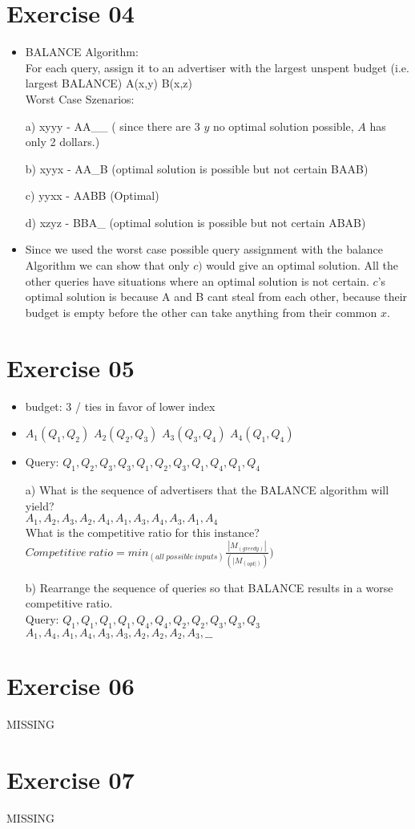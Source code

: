 \documentclass[11pt,a4paper]{scrartcl}
\begin{document}
\section*{Exercise 04}
\begin{itemize}
	\item BALANCE Algorithm:\\
		For each query, assign it to an advertiser with the
		largest unspent budget (i.e. largest BALANCE) A(x,y) B(x,z)\\
		Worst Case Szenarios:

	\item[a)] xyyy - AA\_\_ ( since there are 3 $y$ no optimal solution possible, $A$ has only 2 dollars.)
	
	\item[b)] xyyx - AA\_B (optimal solution is possible but not certain BAAB)
	
	\item[c)] yyxx - AABB (Optimal)
	
	\item[d)] xzyz - BBA\_ (optimal solution is possible but not certain ABAB)
	
	\item Since we used the worst case possible query assignment with the balance Algorithm we can show that only $c)$ 			would give an optimal solution. All the other queries have situations where an optimal solution is not certain.
		$c$'s optimal solution is because A and B cant steal from each other, because their budget is empty before the other 		can take anything from their common $x$.
		
\end{itemize} 

\section*{Exercise 05}
\begin{itemize}
	\item budget: 3 / ties in favor of lower index
	\item $A_1(Q_1,Q_2)$ $A_2(Q_2,Q_3)$ $A_3(Q_3,Q_4)$ $A_4(Q_1,Q_4)$
	\item Query: $Q_1, Q_2, Q_3, Q_3, Q_1, Q_2, Q_3, Q_1, Q_4, Q_1, Q_4$

	\item[a)] What is the sequence of advertisers that the BALANCE algorithm will yield? \\
			$A_1,A_2,A_3,A_2,A_4,A_1,A_3,A_4,A_3,A_1,A_4$\\
	What is the competitive ratio for this instance?\\
	$Competitive\ ratio = min_(all\ possible\ inputs)\frac{|M_(greedy)|}{(|M_(opt|))})$
	
	\item[b)] Rearrange the sequence of queries so that BALANCE results in a worse competitive ratio.\\
		Query: $Q_1, Q_1, Q_1, Q_1, Q_4, Q_4, Q_2, Q_2, Q_3, Q_3, Q_3$\\
		$A_1,A_4,A_1,A_4,A_3,A_3,A_2,A_2,A_2,A_3, \_\_$
\end{itemize} 	
	

\section*{Exercise 06}
MISSING

\section*{Exercise 07}
MISSING
\end{document}
